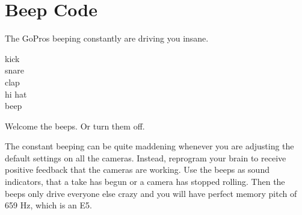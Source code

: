 \section{Beep Code}
\pagecolor{white}
\label{chap:17}
\begin{fullwidth}

\problem

{\large The GoPros beeping constantly are driving you insane. \par}

kick
\\
snare
\\
clap
\\
hi hat
\\
beep



\solution

{\large Welcome the beeps. Or turn them off. \par}

The constant beeping can be quite maddening whenever you are adjusting the default settings on all the cameras. Instead, reprogram your brain to receive positive feedback that the cameras are working. Use the beeps as sound indicators, that a take has begun or a camera has stopped rolling. Then the beeps only drive everyone else crazy and you will have perfect memory pitch of 659 Hz, which is an E5.






\clearpage
\end{fullwidth}
